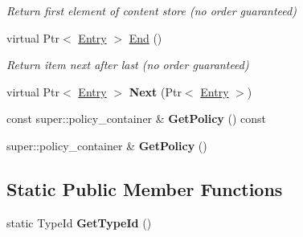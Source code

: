 \begin{DoxyCompactItemize}
\begin{DoxyCompactList}\small\item\em Return first element of content store (no order guaranteed) \end{DoxyCompactList}\item 
virtual Ptr$<$ \hyperlink{classns3_1_1ndn_1_1cs_1_1Entry}{Entry} $>$ \hyperlink{classns3_1_1ndn_1_1cs_1_1ContentStoreImpl_ad21362f6996f388ebcc8a37e79de086b}{End} ()\hypertarget{classns3_1_1ndn_1_1cs_1_1ContentStoreImpl_ad21362f6996f388ebcc8a37e79de086b}{}\label{classns3_1_1ndn_1_1cs_1_1ContentStoreImpl_ad21362f6996f388ebcc8a37e79de086b}

\begin{DoxyCompactList}\small\item\em Return item next after last (no order guaranteed) \end{DoxyCompactList}\item 
virtual Ptr$<$ \hyperlink{classns3_1_1ndn_1_1cs_1_1Entry}{Entry} $>$ {\bfseries Next} (Ptr$<$ \hyperlink{classns3_1_1ndn_1_1cs_1_1Entry}{Entry} $>$)\hypertarget{classns3_1_1ndn_1_1cs_1_1ContentStoreImpl_a734cc52313a2aa6c210d4574f008aa76}{}\label{classns3_1_1ndn_1_1cs_1_1ContentStoreImpl_a734cc52313a2aa6c210d4574f008aa76}

\item 
const super\+::policy\+\_\+container \& {\bfseries Get\+Policy} () const\hypertarget{classns3_1_1ndn_1_1cs_1_1ContentStoreImpl_a6d9fade9e3ee73ea924fb334887bf60a}{}\label{classns3_1_1ndn_1_1cs_1_1ContentStoreImpl_a6d9fade9e3ee73ea924fb334887bf60a}

\item 
super\+::policy\+\_\+container \& {\bfseries Get\+Policy} ()\hypertarget{classns3_1_1ndn_1_1cs_1_1ContentStoreImpl_aa698a9c8f9a5e5e9e0da03ca34ed45d6}{}\label{classns3_1_1ndn_1_1cs_1_1ContentStoreImpl_aa698a9c8f9a5e5e9e0da03ca34ed45d6}

\end{DoxyCompactItemize}
\subsection*{Static Public Member Functions}
\begin{DoxyCompactItemize}
\item 
static Type\+Id {\bfseries Get\+Type\+Id} ()\hypertarget{classns3_1_1ndn_1_1cs_1_1ContentStoreImpl_a3a764d590d9a911b337c7db2be0b6670}{}\label{classns3_1_1ndn_1_1cs_1_1ContentStoreImpl_a3a764d590d9a911b337c7db2be0b6670}

\end{DoxyCompactItemize}
